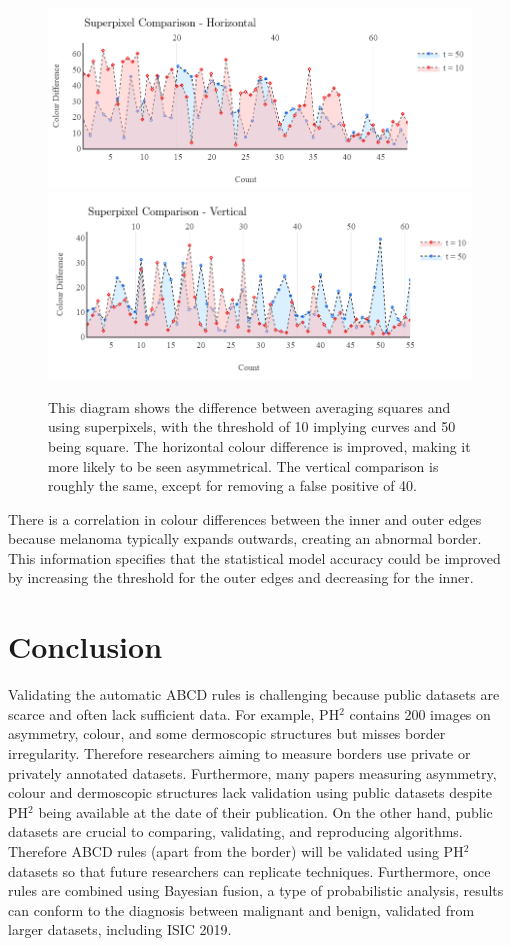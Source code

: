 \documentclass[10.5pt]{report}
\begin{document}
\begin{figure}
\centering
\includegraphics[scale=0.7]{superpixel2.png}
\includegraphics[scale=0.7]{superpixel1.png}
\caption{This diagram shows the difference between averaging squares and using superpixels, with the threshold of 10 implying curves and 50 being square. The horizontal colour difference is improved, making it more likely to be seen asymmetrical. The vertical comparison is roughly the same, except for removing a false positive of 40.}
\end{figure} \label{asy3}

There is a correlation in colour differences between the inner and outer edges because melanoma typically expands outwards, creating an abnormal border. This information specifies that the statistical model accuracy could be improved by increasing the threshold for the outer edges and decreasing for the inner.

\chapter{Conclusion}
Validating the automatic ABCD rules is challenging because public datasets are scarce and often lack sufficient data. For example, PH$^2$ contains 200 images on asymmetry, colour, and some dermoscopic structures but misses border irregularity. Therefore researchers aiming to measure borders use private or privately annotated datasets. Furthermore, many papers measuring asymmetry, colour and dermoscopic structures lack validation using public datasets despite PH$^2$ being available at the date of their publication. On the other hand, public datasets are crucial to comparing, validating, and reproducing algorithms. Therefore ABCD rules (apart from the border) will be validated using PH$^2$ datasets so that future researchers can replicate techniques. Furthermore, once rules are combined using Bayesian fusion, a type of probabilistic analysis, results can conform to the diagnosis between malignant and benign, validated from larger datasets, including ISIC 2019.
\end{document}
